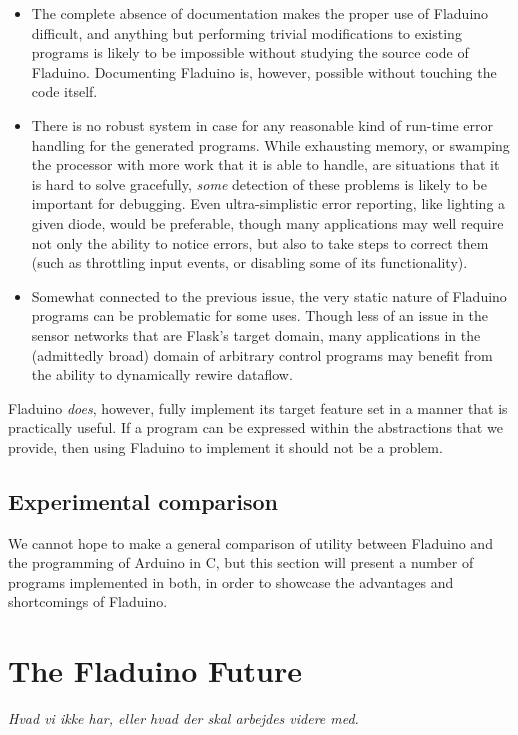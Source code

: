 \documentclass[a4paper, oneside, final]{memoir}
\begin{document}
\begin{itemize}
\item The complete absence of documentation makes the proper use of
  Fladuino difficult, and anything but performing trivial
  modifications to existing programs is likely to be impossible
  without studying the source code of Fladuino.  Documenting Fladuino
  is, however, possible without touching the code itself.
\item There is no robust system in case for any reasonable kind of
  run-time error handling for the generated programs.  While
  exhausting memory, or swamping the processor with more work that it
  is able to handle, are situations that it is hard to solve
  gracefully, \textit{some} detection of these problems is likely to
  be important for debugging.  Even ultra-simplistic error reporting,
  like lighting a given diode, would be preferable, though many
  applications may well require not only the ability to notice errors,
  but also to take steps to correct them (such as throttling input
  events, or disabling some of its functionality).
\item Somewhat connected to the previous issue, the very static nature
  of Fladuino programs can be problematic for some uses.  Though less
  of an issue in the sensor networks that are Flask's target domain,
  many applications in the (admittedly broad) domain of arbitrary
  control programs may benefit from the ability to dynamically rewire
  dataflow.
\end{itemize}

Fladuino \textit{does}, however, fully implement its target feature
set in a manner that is practically useful.  If a program can be
expressed within the abstractions that we provide, then using Fladuino
to implement it should not be a problem.

\section{Experimental comparison}

We cannot hope to make a general comparison of utility between
Fladuino and the programming of Arduino in C, but this section will
present a number of programs implemented in both, in order to showcase
the advantages and shortcomings of Fladuino.

\chapter{The Fladuino Future}
\label{chap:futurework}
\textit{Hvad vi ikke har, eller hvad der skal arbejdes videre med. }
\end{document}
